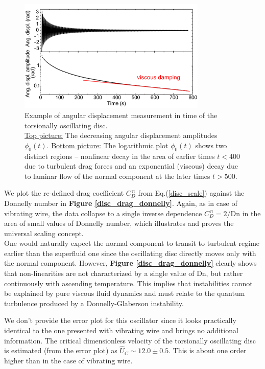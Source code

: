 \begin{figure}[h]
	\centering
  \includegraphics[width=0.8\textwidth]{graphics/results/disc_extrema}
  \caption{Example of angular displacement measurement in time of the torsionally oscillating disc.\\
  \underline{Top picture:} The decreasing angular displacement amplitudes $\phi_0 (t)$.
  \underline{Bottom picture:} The logarithmic plot $\phi_0 (t)$ shows two distinct regions – nonlinear decay in the area of earlier times $t < 400$ due to turbulent drag forces and an exponential (viscous) decay due to laminar flow of the normal component at the later times $t > 500$.}
  \label{disc_extrema}
\end{figure}

We plot the re-defined drag coefficient $C_D^{\,n}$ from Eq.(\ref{disc_scale}) against the Donnelly number in \textbf{Figure \ref{disc_drag_donnelly}}.
Again, as in case of vibrating wire, the data collapse to a single inverse dependence $C_D^{\,n} = 2 / \text{Dn}$ in the area of small values of Donnelly number, which illustrates and proves the universal scaling concept.\\
One would naturally expect the normal component to transit to turbulent regime earlier than the superfluid one since the oscillating disc directly moves only with the normal component. However, \textbf{Figure \ref{disc_drag_donnelly}} clearly shows that non-linearities are not characterized by a single value of Dn, but rather continuously with ascending temperature. This implies that instabilities cannot be explained by pure viscous fluid dynamics and must relate to the quantum turbulence produced by a Donnelly-Glaberson instability.

We don't provide the error plot for this oscillator since it looks practically identical to the one presented with vibrating wire and brings no additional information. The critical dimensionless velocity of the torsionally oscillating disc is estimated (from the error plot) as $\hat{U}_C \sim 12.0 \pm 0.5$. This is about one order higher than in the case of vibrating wire.

